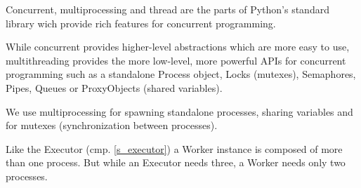 Concurrent, multiprocessing and thread are the parts of
Python's standard library wich provide rich features for
concurrent programming.

While concurrent provides higher-level abstractions which
are more easy to use, multithreading provides the more
low-level, more powerful APIs for concurrent programming
such as a standalone Process object, Locks (mutexes),
Semaphores, Pipes, Queues or ProxyObjects
(shared variables).

We use multiprocessing for spawning standalone processes,
sharing variables and for mutexes (synchronization between
processes).


Like the Executor (cmp. \ref{s_executor}) a Worker instance
is composed of more than one process. But while an
Executor needs three, a Worker needs only two processes.

